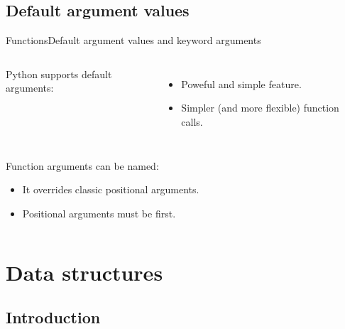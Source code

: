 \documentclass[10pt,compress]{beamer} %
\begin{document}
\subsection{Default argument values}
\begin{frame}{Functions}{Default argument values and keyword arguments}
    \begin{columns}
	Python supports default arguments:
		\begin{itemize}
		\item Poweful and simple feature.
		\item Simpler (and more flexible) function calls.
		\end{itemize}
		\vspace{-0.2cm}
		\begin{block}{}
		\vspace{-0.2cm}
		
		\vspace{-0.2cm}
		\end{block}
	\end{columns}
	Function arguments can be named:
		\begin{itemize}
		\item It overrides classic positional arguments.
		\item Positional arguments must be first.
		\end{itemize}
		\vspace{-0.2cm}
    \begin{columns}
		\begin{block}{}
		\vspace{-0.2cm}
		
		\vspace{-0.2cm}
		\end{block}

	\column{0.6\textwidth}
		\begin{block}{}
		\vspace{-0.2cm}
		
		\vspace{-0.2cm}
		\end{block}
	\end{columns}
\end{frame}


\section{Data structures}
\subsection{Introduction}
\end{document}
